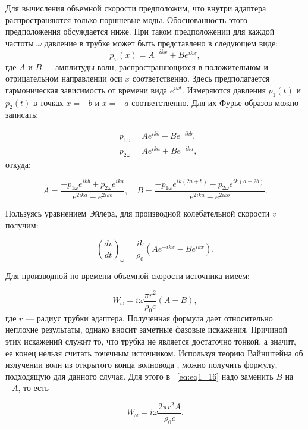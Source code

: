 Для вычисления объемной скорости предположим, что внутри адаптера распространяются только поршневые моды. Обоснованность этого предположения обсуждается ниже. При таком предположении для каждой частоты $\omega$ давление в трубке может быть представлено в следующем виде:
\begin{equation}
p_\omega(x) = A^{-ikx} + Be^{ikx},
\end{equation}
где $A$ и $B$ — амплитуды волн, распространяющихся в положительном и отрицательном направлении оси $x$ соответственно. Здесь предполагается гармоническая зависимость от времени вида $e^{i\omega t}$. Измеряются давления $p_1(t)$ и $p_2(t)$ в точках $x = -b$ и $x = -a$ соответственно. Для их Фурье-образов можно записать:

\begin{eqnarray}
\label{eq:twomic}
&p_{1\omega} = A e^{ikb} + Be^{-ikb},\\
&p_{2\omega} = A e^{ika} + Be^{-ika},
\end{eqnarray}
откуда:

\begin{equation}
A = \frac{-p_{1\omega}e^{ikb} + p_{2\omega}e^{ika} }{e^{2ika} - e^{2ikb}}, \quad B = \frac{-p_{1\omega}e^{ik(2a+b)} - p_{2\omega}e^{ik(a+2b)} }{e^{2ika} - e^{2ikb}}.
\end{equation}

Пользуясь уравнением Эйлера, для производной колебательной скорости $v$ получим:

\begin{equation}
\label{eq:eq1_16}
\left(\frac{dv}{dt}\right)_\omega = \frac{ik}{\rho_0} (A e^{-ikx} - Be^{ikx}).
\end{equation}

Для производной по времени объемной скорости источника имеем:

\begin{equation}
\label{eq:proizv_vrem}
W_\omega = i\omega \frac{\pi r^2}{\rho_0 c}(A-B),
\end{equation}
где $r$ — радиус трубки адаптера. Полученная формула дает относительно неплохие результаты, однако вносит заметные фазовые искажения. Причиной этих искажений служит то, что трубка не является достаточно тонкой, а значит, ее конец нельзя считать точечным источником. Используя теорию Вайнштейна об излучении волн из открытого конца волновода \cite{Weinstein1966}, можно получить формулу, подходящую для данного случая. Для этого в ~\eqref{eq:eq1_16} надо заменить $B$ на $-A$, то есть

\begin{equation}
W_\omega = i\omega\frac{2\pi r^2 A}{\rho_0 c}.
\end{equation}

